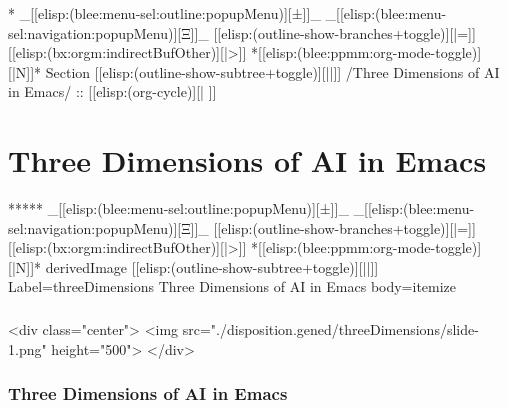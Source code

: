 \begin{whenOrg}
\begin{whenOrg}
*  _[[elisp:(blee:menu-sel:outline:popupMenu)][±]]_ _[[elisp:(blee:menu-sel:navigation:popupMenu)][Ξ]]_ [[elisp:(outline-show-branches+toggle)][|=]] [[elisp:(bx:orgm:indirectBufOther)][|>]] *[[elisp:(blee:ppmm:org-mode-toggle)][|N]]*  Section    [[elisp:(outline-show-subtree+toggle)][||]]   /Three Dimensions of AI in Emacs/ ::  [[elisp:(org-cycle)][| ]]
\end{whenOrg}

\section{Three Dimensions of AI in Emacs}

\begin{whenOrg}
*****  _[[elisp:(blee:menu-sel:outline:popupMenu)][±]]_ _[[elisp:(blee:menu-sel:navigation:popupMenu)][Ξ]]_ [[elisp:(outline-show-branches+toggle)][|=]] [[elisp:(bx:orgm:indirectBufOther)][|>]] *[[elisp:(blee:ppmm:org-mode-toggle)][|N]]*  derivedImage [[elisp:(outline-show-subtree+toggle)][||]] Label=threeDimensions Three Dimensions of AI in Emacs body=itemize
\end{whenOrg}

\begin{htmlonly}

\begin{frame}[fragile,plain,label=threeDimensions]
    \frametitle{}
    \framesubtitle{}
    \begin{rawhtml}
<div class="center">
<img src="./disposition.gened/threeDimensions/slide-1.png" height="500">
</div>
    \end{rawhtml}
\end{frame}
\end{htmlonly}

\begin{verblatex}

\begin{frame}[fragile,plain,label=threeDimensions]
    \frametitle{Three Dimensions of AI in Emacs}
    \framesubtitle{}


\end{frame}
\end{verblatex}
\end{whenOrg}
